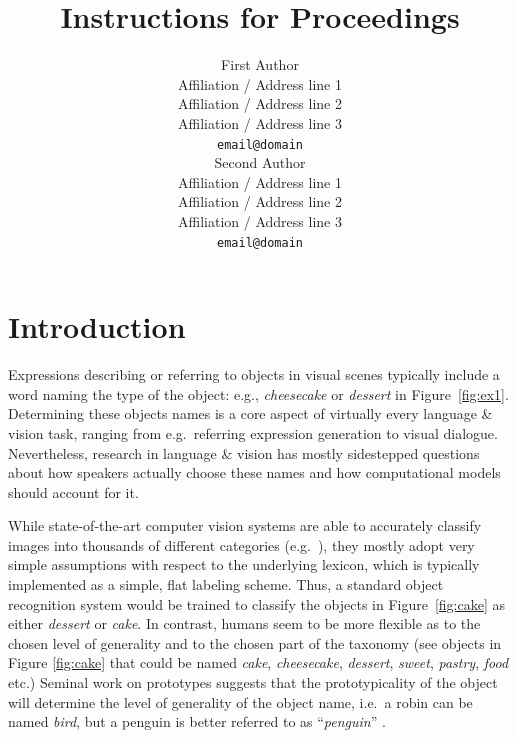 \documentclass[11pt,a4paper]{article}
\title{Instructions for \confname{} Proceedings}
\author{First Author \\
  Affiliation / Address line 1 \\
  Affiliation / Address line 2 \\
  Affiliation / Address line 3 \\
  {\tt email@domain} \\\And
  Second Author \\
  Affiliation / Address line 1 \\
  Affiliation / Address line 2 \\
  Affiliation / Address line 3 \\
  {\tt email@domain} \\}
\date{}
\begin{document}
\maketitle
\begin{abstract}
\end{abstract}


\newcommand{\refexp}[1]{\textsl{#1}}
\newcommand{\word}[1]{\textsl{#1}}
\newcommand{\cat}[1]{\textsc{#1}}
\newcommand{\vgenome}{VisualGenome\xspace}
\newcommand{\ra}{$\rightarrow$}

\newcommand{\sz}[1]{\textcolor{blue}{\emph{//sz: #1//}}}


\section{Introduction}

Expressions describing or referring to objects in visual scenes typically include a word naming the type of the object: e.g.,  \emph{cheesecake} or  \emph{dessert}  in Figure~\ref{fig:ex1}. 
Determining these objects names is a core aspect of virtually every language \& vision task, ranging from e.g.\ referring expression generation to visual dialogue.
Nevertheless, research in language \& vision has mostly  sidestepped questions about how speakers actually choose these names and how computational models should account for it.



While state-of-the-art computer vision systems are able to accurately classify images into thousands of different categories (e.g.\  ), they mostly adopt very simple assumptions with respect to the underlying lexicon, which is typically implemented as a simple, flat labeling scheme. Thus, a standard object recognition system would be trained to classify the objects in Figure~\ref{fig:cake} as either  \emph{dessert} or \emph{cake}.
In contrast, humans seem to be more flexible as to the chosen level of generality and to the chosen part of the taxonomy (see objects in Figure \ref{fig:cake} that could be named \refexp{cake}, \refexp{cheesecake}, \refexp{dessert}, \refexp{sweet}, \refexp{pastry}, \refexp{food} etc.) 
Seminal work on prototypes suggests that the prototypicality of the object will determine the level of generality of the object name, i.e.\  a robin can be named \emph{bird}, but a penguin is better referred to as ``\emph{penguin}'' \cite{Rosch1978}.

\end{document}
